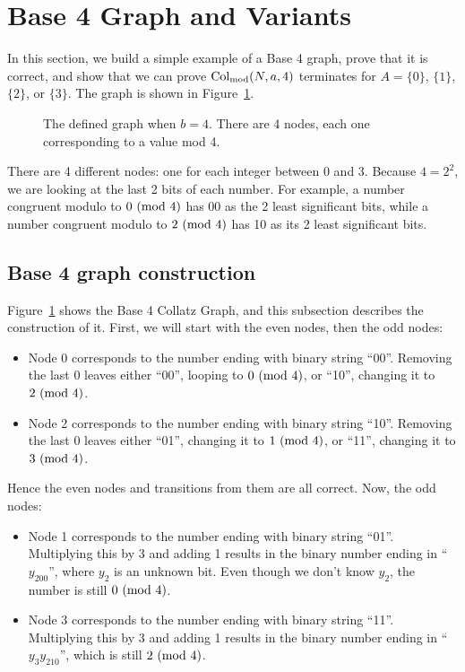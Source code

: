 \section{Base 4 Graph and Variants} \label{subsec:base4graph}
In this section, we build a simple example of a Base 4 graph, prove that it is correct, and show that we can prove $\mathrm{Col}_{\text{mod}}(N,a,4)$ terminates
for $A = \{0\}$, $\{1\}$, $\{2\}$, or $\{3\}$. The graph is shown in Figure~\ref{fig:base_4_graph}. \par
\begin{figure}
    \centering
    \caption{The defined graph when $b = 4$. There are 4 nodes, each one corresponding to a value mod 4.}
    \label{fig:base_4_graph}
\end{figure}
There are 4 different nodes: one for each integer between 0 and 3. Because $4 = 2^2$, we are looking at the last 2 bits of each number. For example, a number congruent modulo to $0\ (\mathrm{mod}\ 4)$ has 00 as the 2 least significant bits, while a number congruent modulo to $2\ (\mathrm{mod}\ 4)$ has 10 as its 2 least significant bits. 
\subsection{Base 4 graph construction} \label{subsubsec:proofbase4graph}
Figure~\ref{fig:base_4_graph} shows the Base 4 Collatz Graph, and this subsection describes the construction of it. First, we will start with the even nodes, then the odd nodes:
\begin{itemize}
    \item Node 0 corresponds to the number ending with binary string ``00''. Removing the last 0 leaves either ``00'', looping to $0\ (\mathrm{mod}\ 4)$, or ``10'', changing it to $2\ (\mathrm{mod}\ 4)$.
    \item Node 2 corresponds to the number ending with binary string ``10''. Removing the last 0 leaves either ``01'', changing it to $1\ (\mathrm{mod}\ 4)$, or ``11'', changing it to $3\ (\mathrm{mod}\ 4)$.
\end{itemize}
Hence the even nodes and transitions from them are all correct. Now, the odd nodes:
\begin{itemize}
    \item Node 1 corresponds to the number ending with binary string ``01''. Multiplying this by 3 and adding 1 results in the binary number ending in ``$y_200$'', where $y_2$ is an unknown bit. Even though we don't know $y_2$, the number is still $0\ (\mathrm{mod}\ 4)$.
    \item Node 3 corresponds to the number ending with binary string ``11''. Multiplying this by 3 and adding 1 results in the binary number ending in ``$y_3y_210$'', which is still $2\ (\mathrm{mod}\ 4)$.
\end{itemize}
